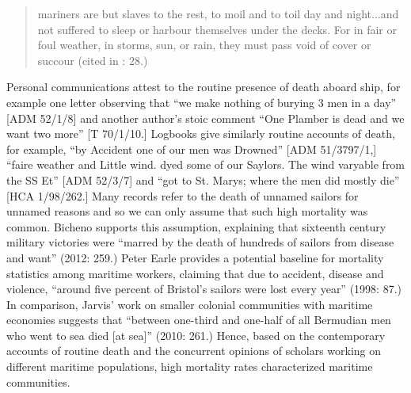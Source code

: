 \begin{quotation}
mariners are but slaves to the rest, to moil and to toil day and night...and not suffered to sleep or harbour themselves under the decks. For in fair or foul weather, in storms, sun, or rain, they must pass void of cover or succour (cited in \citealt{Lavery2009}: 28.) \end{quotation}

Personal communications attest to the routine presence of death aboard ship, for example one letter observing that “we make nothing of burying 3 men in a day” [ADM 52/1/8] and another author’s stoic comment “One Plamber is dead and we want two more” [T 70/1/10.] Logbooks give similarly routine accounts of death, for example, “by Accident one of our men was Drowned” [ADM 51/3797/1,] “faire weather and Little wind. dyed some of our Saylors. The wind varyable from the SS Et” [ADM 52/3/7] and “got to St. Marys; where the men did mostly die” [HCA 1/98/262.] Many records refer to the death of unnamed sailors for unnamed reasons and so we can only assume that such high mortality was common. Bicheno supports this assumption, explaining that sixteenth century military victories were “marred by the death of hundreds of sailors from disease and want” (2012: 259.) Peter Earle provides a potential baseline for mortality statistics among maritime workers, claiming that due to accident, disease and violence, “around five percent of Bristol’s sailors were lost every year” (1998: 87.) In comparison, Jarvis’ work on smaller colonial communities with maritime economies suggests that “between one-third and one-half of all Bermudian men who went to sea died [at sea]” (2010: 261.) Hence, based on the contemporary accounts of routine death and the concurrent opinions of scholars working on different maritime populations, high mortality rates characterized maritime communities. 

